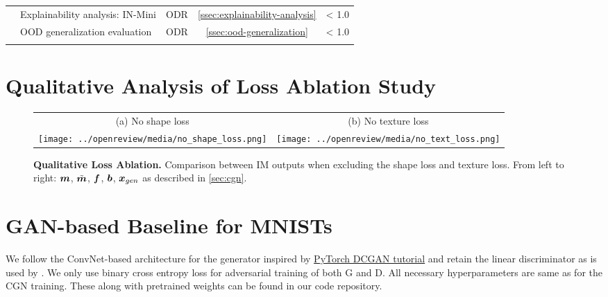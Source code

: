 \begin{table}[H]
{\begin{tabular}{@{}llccc@{}}
\arrayrulecolor{lightgray}\cmidrule(l){2-5}
                                       & Explainability analysis: IN-Mini                   & ODR                       & \ref{ssec:explainability-analysis}                 & < 1.0                                       \\
\arrayrulecolor{lightgray}\cmidrule(l){2-5}
                                       & OOD generalization evaluation                  & ODR                       & \ref{ssec:ood-generalization}                 & < 1.0                                       \\
\arrayrulecolor{black}\bottomrule
\end{tabular}%
}
\end{table}


\section{Qualitative Analysis of Loss Ablation Study}
\label{app:loss-ablation-qualitative}
\begin{figure}[H]
    \centering
    \begin{tabular}{@{}c@{ \ }c}
         \small (a) No shape loss & \small (b) No texture loss \\

         \texttt{[image: ../openreview/media/no\_shape\_loss.png]} &
         \texttt{[image: ../openreview/media/no\_text\_loss.png]} \\
    \end{tabular}
    \caption{\textbf{Qualitative Loss Ablation.} Comparison between IM outputs when excluding the shape loss and texture loss. From left to right: $\boldsymbol{m}$, $\tilde{\boldsymbol{m}}$, $\boldsymbol{f}$, $\boldsymbol{b}$, $\boldsymbol{x}_{gen}$ as described in \cref{sec:cgn}.}
    \label{fig:loss-ablation-qualitative}
\end{figure}

\section{GAN-based Baseline for MNISTs} \label{app:gan}
We follow the ConvNet-based architecture for the generator inspired by \href{https://pytorch.org/tutorials/beginner/dcgan_faces_tutorial.html}{PyTorch DCGAN tutorial} and retain the linear discriminator as is used by \citet{Sauer2021ICLR}.
We only use binary cross entropy loss for adversarial training of both G and D. All necessary hyperparameters are same as for the CGN training. These along with pretrained weights can be found in our code repository.

